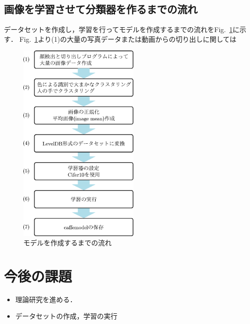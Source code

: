 \documentclass[a4paper,10pt]{jsarticle}
\begin{document}
\subsection{画像を学習させて分類器を作るまでの流れ}
データセットを作成し，学習を行ってモデルを作成するまでの流れをFig.~\ref{fig:モデルを作成するまでの流れ}に示す．
Fig.~\ref{fig:モデルを作成するまでの流れ}より(1)の大量の写真データまたは動画からの切り出しに関しては
\begin{figure}[tb]
  \begin{center}
    \includegraphics[clip,width=6cm]{fig/eps/learning_flow.eps}
  \end{center}
  \caption{モデルを作成するまでの流れ}
  \label{fig:モデルを作成するまでの流れ}
\end{figure}


\section{今後の課題}
\begin{itemize}
 \item 理論研究を進める．
 \item データセットの作成，学習の実行
\end{itemize}
\end{document}
